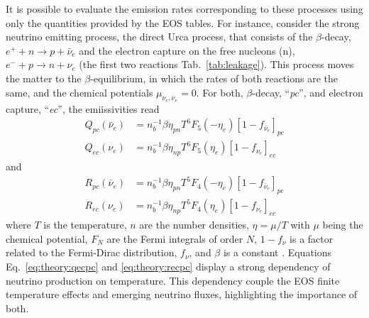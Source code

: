It is possible to evaluate the emission rates corresponding to these processes 
using only the quantities provided by the \ac{EOS} tables.
%
For instance, consider the strong neutrino emitting process, the direct Urca process, 
that consists of the $\beta$-decay, $e^+ + n \rightarrow p + \bar{\nu}_e$ 
and the electron capture on the free nucleons (n), $e^{-} + p \rightarrow n + \nu_e$ 
(the first two reactions Tab.~\ref{tab:leakage}). 
This process moves the matter to the $\beta$-equilibrium, in which the rates 
of both reactions are the same, and the chemical potentials $\mu_{\nu_e,\bar{\nu}_e}=0$.
%
For both, $\beta$-decay, ``\textit{pc}'', and electron capture, ``\textit{ec}'', the emiissivities read \citep{Galeazzi:2013mia}
\begin{equation}
\begin{aligned}
    Q_{pc}(\bar{\nu}_e) &= n_b^{-1}\beta\eta_{pn}T^6F_5(-\eta_e)[1-f_{\bar{\nu}_e}]_{pc} \\
    Q_{ec}(\nu_e) &= n_b^{-1}\beta\eta_{np}T^6F_{5}(\eta_e)[1-f_{\nu_e}]_{ec}
\end{aligned}
\label{eq:theory:qecpc}
\end{equation}
and
\begin{equation}
\begin{aligned}
    R_{pc}(\bar{\nu}_e) &= n_b^{-1}\beta\eta_{pn}T^5F_4(-\eta_e)[1-f_{\bar{\nu}_e}]_{pc} \\
    R_{ec}(\nu_e) &= n_b^{-1}\beta\eta_{np}T^5F_{4}(\eta_e)[1-f_{\nu_e}]_{ec}
\end{aligned}
\label{eq:theory:recpc}
\end{equation}
where $T$ is the temperature, $n$ are the number densities, $\eta=\mu/T$ with $\mu$ being the 
chemical potential, $F_N$ are the Fermi integrals of order $N$,
$1-f_{\nu}$ is a factor related to the Fermi-Dirac distribution, $f_{\nu}$, and $\beta$
is a constant \citep{Bruenn:1985}.
%
Equations Eq.~\eqref{eq:theory:qecpc} and \eqref{eq:theory:recpc} display a strong dependency 
of neutrino production on temperature. This dependency couple 
the \ac{EOS} finite temperature effects and emerging neutrino fluxes,
highlighting the importance of both.
%
%


